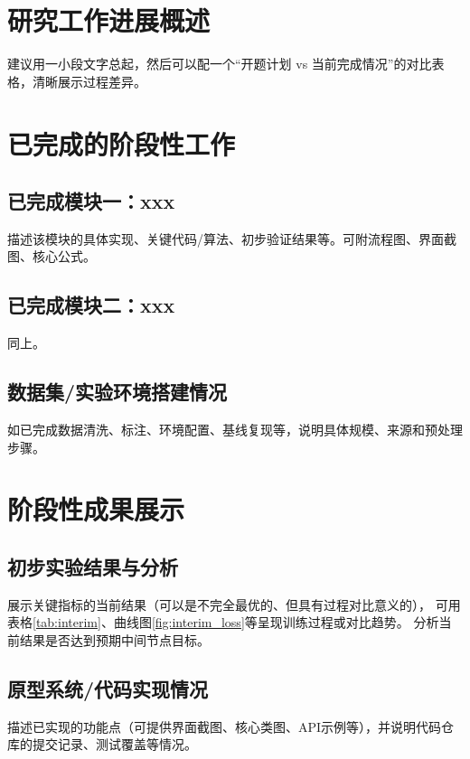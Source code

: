 \documentclass{style/course-report}
\begin{document}
\makecover


\section{研究工作进展概述}
建议用一小段文字总起，然后可以配一个“开题计划 vs 当前完成情况”的对比表格，清晰展示过程差异\cite{YunNan,Chen2025IoVCrowdsensing,JTBH202106001}。

\section{已完成的阶段性工作}
\subsection{已完成模块一：xxx}
描述该模块的具体实现、关键代码/算法、初步验证结果等。可附流程图、界面截图、核心公式。

\subsection{已完成模块二：xxx}
同上。

\subsection{数据集/实验环境搭建情况}
如已完成数据清洗、标注、环境配置、基线复现等，说明具体规模、来源和预处理步骤。

\section{阶段性成果展示}
\subsection{初步实验结果与分析}
展示关键指标的当前结果（可以是不完全最优的、但具有过程对比意义的），
可用表格\ref{tab:interim}、曲线图\ref{fig:interim_loss}等呈现训练过程或对比趋势。
分析当前结果是否达到预期中间节点目标。

\subsection{原型系统/代码实现情况}
描述已实现的功能点（可提供界面截图、核心类图、API示例等），并说明代码仓库的提交记录、测试覆盖等情况。
\end{document}
